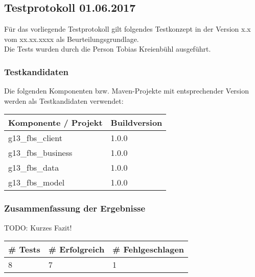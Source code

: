 \subsection{Testprotokoll 01.06.2017}
Für das vorliegende Testprotokoll gilt folgendes Testkonzept in der Version x.x vom xx.xx.xxxx als Beurteilungsgrundlage. \\
Die Tests wurden durch die Person Tobias Kreienbühl ausgeführt.
\subsubsection{Testkandidaten}
Die folgenden Komponenten bzw. Maven-Projekte mit entsprechender Version werden als Testkandidaten verwendet:\\
\begin{tabular}{|l|l|}
	\hline \rowcolor{gray!50}
	\textbf{Komponente / Projekt} & \textbf{Buildversion} \\ 
	\hline 
	g13\_fbs\_client & 1.0.0 \\ 
	\hline 
	g13\_fbs\_business & 1.0.0 \\ 
	\hline 
	g13\_fbs\_data & 1.0.0 \\ 
	\hline 
	g13\_fbs\_model & 1.0.0 \\ 
	\hline 
\end{tabular} 

\subsubsection{Zusammenfassung der Ergebnisse}
TODO: Kurzes Fazit! \\
\begin{tabular}{|l|l|l|}
	\hline \rowcolor{gray!50}
	\textbf{\# Tests} & \textbf{\# Erfolgreich} & \textbf{\# Fehlgeschlagen} \\ 
	\hline 
	8 & 7 & 1 \\ 
	\hline 
\end{tabular} 

